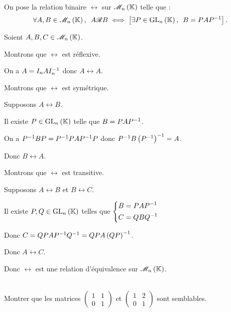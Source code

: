 \begin{dem}
On pose la relation binaire \(\rel\) sur \(\M{n}\) telle que : \[\quantifs{\forall A,B\in\M{n}}A\rel B\ssi\croch{\quantifs{\exists P\in\GL{n}}B=PAP\inv}.\]

Soient \(A,B,C\in\M{n}\).

Montrons que \(\rel\) est réflexive.

On a \(A=I_nAI_n^{-1}\) donc \(A\rel A\).

Montrons que \(\rel\) est symétrique.

Supposons \(A\rel B\).

Il existe \(P\in\GL{n}\) telle que \(B=PAP^{-1}\).

On a \(P^{-1} BP=P^{-1} PAP^{-1} P\) donc \(P^{-1} B\left(P^{-1}\right)^{-1}=A\).

Donc \(B\rel A\).

Montrons que \(\rel\) est transitive.

Supposons \(A\rel B\) et \(B\rel C\).

Il existe \(P,Q\in\GL{n}\) telles que \(\begin{dcases}
B=PAP^{-1} \\
C=QBQ^{-1}
\end{dcases}\)

Donc \(C=QPAP^{-1} Q^{-1}=QPA\left(QP\right)^{-1}\).

Donc \(A\rel C\).

Donc \(\rel\) est une relation d'équivalence sur \(\M{n}\).
\end{dem}

\begin{exoex}~\\
Montrer que les matrices \(\begin{pmatrix}
1 & 1 \\
0 & 1
\end{pmatrix}\) et \(\begin{pmatrix}
1 & 2 \\
0 & 1
\end{pmatrix}\) sont semblables.
\end{exoex}

